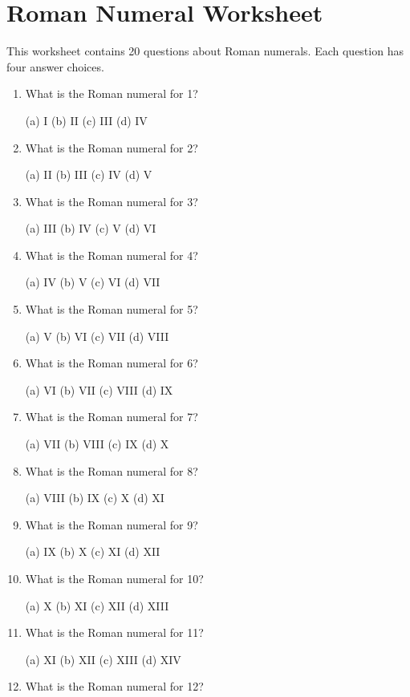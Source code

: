 \documentclass{article}
\begin{document}
\section{Roman Numeral Worksheet}

This worksheet contains 20 questions about Roman numerals. Each question has four answer choices.

\begin{enumerate}

\item What is the Roman numeral for 1?

(a) I
(b) II
(c) III
(d) IV

\item What is the Roman numeral for 2?

(a) II
(b) III
(c) IV
(d) V

\item What is the Roman numeral for 3?

(a) III
(b) IV
(c) V
(d) VI

\item What is the Roman numeral for 4?

(a) IV
(b) V
(c) VI
(d) VII

\item What is the Roman numeral for 5?

(a) V
(b) VI
(c) VII
(d) VIII

\item What is the Roman numeral for 6?

(a) VI
(b) VII
(c) VIII
(d) IX

\item What is the Roman numeral for 7?

(a) VII
(b) VIII
(c) IX
(d) X

\item What is the Roman numeral for 8?

(a) VIII
(b) IX
(c) X
(d) XI

\item What is the Roman numeral for 9?

(a) IX
(b) X
(c) XI
(d) XII

\item What is the Roman numeral for 10?

(a) X
(b) XI
(c) XII
(d) XIII

\item What is the Roman numeral for 11?

(a) XI
(b) XII
(c) XIII
(d) XIV

\item What is the Roman numeral for 12?


\end{enumerate}
\end{document}
